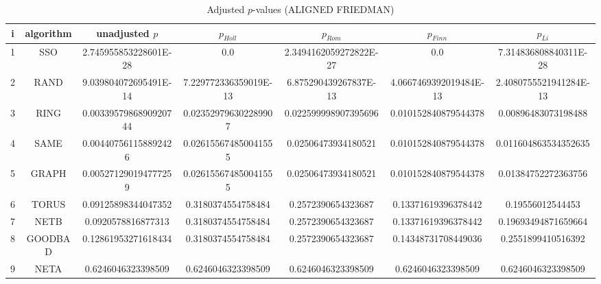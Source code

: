 \documentclass[a4paper,10pt]{article}
\begin{document}
\begin{landscape}
\begin{table}[!htp]
\centering\scriptsize
\caption{Adjusted $p$-values (ALIGNED FRIEDMAN)}
\begin{tabular}{ccccccc}
i&algorithm&unadjusted $p$&$p_{Holl}$&$p_{Rom}$&$p_{Finn}$&$p_{Li}$\\
\hline
1& SSO&2.745955853228601E-28&0.0&2.3494162059272822E-27&0.0&7.314836808840311E-28\\
2& RAND&9.039804072695491E-14&7.229772336359019E-13&6.875290439267837E-13&4.0667469392019484E-13&2.4080755521941284E-13\\
3& RING&0.0033957986890920744&0.023529796302289907&0.022599998907395696&0.010152840879544378&0.00896483073198488\\
4& SAME&0.004407561158892426&0.026155674850041555&0.02506473934180521&0.010152840879544378&0.011604863534352635\\
5& GRAPH&0.005271290194777259&0.026155674850041555&0.02506473934180521&0.010152840879544378&0.01384752272363756\\
6& TORUS&0.09125898344047352&0.3180374554758484&0.2572390654323687&0.13371619396378442&0.19556012544453\\
7& NETB&0.0920578816877313&0.3180374554758484&0.2572390654323687&0.13371619396378442&0.19693494871659664\\
8& GOODBAD&0.12861953271618434&0.3180374554758484&0.2572390654323687&0.14348731708449036&0.2551899410516392\\
9& NETA&0.6246046323398509&0.6246046323398509&0.6246046323398509&0.6246046323398509&0.6246046323398509\\
\hline
\end{tabular}
\end{table}


\newpage


\end{landscape}
\end{document}
